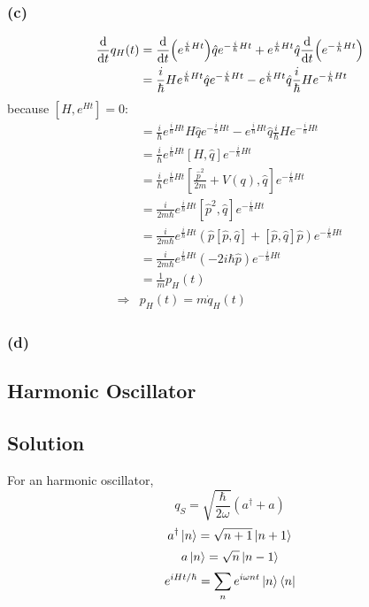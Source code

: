\documentclass{article}
\begin{document}
\subsubsection*{(c)}
\begin{equation*}
    \begin{split}
        \dv{t}q_H(t) & =\dv{t}(e^{\frac{i}{\hbar}Ht})\hat qe^{-\frac{i}{\hbar}Ht}+e^{\frac{i}{\hbar}Ht}\hat q\dv{t}(e^{-\frac{i}{\hbar}Ht})\\
        & = \frac{i}{\hbar}He^{\frac{i}{\hbar}Ht}\hat qe^{-\frac{i}{\hbar}Ht}-e^{\frac{i}{\hbar}Ht}\hat q\frac{i}{\hbar}He^{-\frac{i}{\hbar}Ht}\\
    \end{split}
\end{equation*}
because $[H,e^{Ht}]=0$:
\begin{equation*}
    \begin{split}
        & = \frac{i}{\hbar}e^{\frac{i}{\hbar}Ht} H\hat qe^{-\frac{i}{\hbar}Ht}-e^{\frac{i}{\hbar}Ht}\hat q\frac{i}{\hbar}He^{-\frac{i}{\hbar}Ht}\\
        & = \frac{i}{\hbar}e^{\frac{i}{\hbar}Ht}[H,\hat q]e^{-\frac{i}{\hbar}Ht}\\
        & = \frac{i}{\hbar}e^{\frac{i}{\hbar}Ht}[\frac{\hat{p}^2}{2m}+V(q),\hat q]e^{-\frac{i}{\hbar}Ht}\\
        & = \frac{i}{2m\hbar}e^{\frac{i}{\hbar}Ht}[\hat{p}^2,\hat q]e^{-\frac{i}{\hbar}Ht}\\
        & = \frac{i}{2m\hbar}e^{\frac{i}{\hbar}Ht}(\hat p[\hat p,\hat q]+[\hat p,\hat q]\hat p)e^{-\frac{i}{\hbar}Ht}\\
        & = \frac{i}{2m\hbar}e^{\frac{i}{\hbar}Ht}(-2i\hbar \hat p)e^{-\frac{i}{\hbar}Ht}\\
        & = \frac{1}{m}p_H(t)\\
        \Rightarrow & p_H(t)=m\dot{q}_H(t)
    \end{split}
\end{equation*}
\subsubsection*{(d)}

\subsection*{Harmonic Oscillator}
\subsection*{Solution}
For an harmonic oscillator,\\
\begin{equation*}
    q_S=\sqrt{\frac{\hbar}{2\omega}}(a^\dagger + a)
\end{equation*}
\begin{equation*}
    a^\dagger\ket{n}=\sqrt{n+1}\ket{n+1}
\end{equation*}
\begin{equation*}
    a\ket{n}=\sqrt{n}\ket{n-1}
\end{equation*}
\begin{equation*}
    e^{iHt/\hbar}=\sum_{n}e^{i\omega nt}\ket{n}\bra{n}
\end{equation*}
\end{document}
